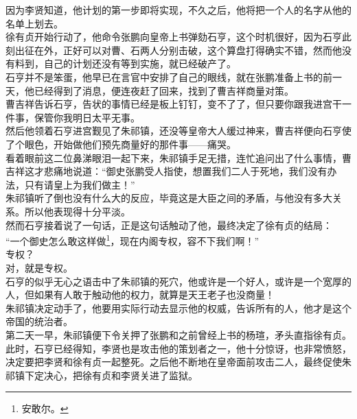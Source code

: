 \begin{multicols}{\theparacolNo}
因为李贤知道，他计划的第一步即将实现，不久之后，他将把一个人的名字从他的名单上划去。\\

徐有贞开始行动了，他命令张鹏向皇帝上书弹劾石亨，这个时机很好，因为石亨此刻出征在外，正好可以对曹、石两人分别击破，这个算盘打得确实不错，然而他没有料到，自己的计划还没有等到实施，就已经破产了。\\

石亨并不是笨蛋，他早已在言官中安排了自己的眼线，就在张鹏准备上书的前一天，他已经得到了消息，便连夜赶了回来，找到了曹吉祥商量对策。\\

曹吉祥告诉石亨，告状的事情已经是板上钉钉，变不了了，但只要你跟我进宫干一件事，保管你我明日太平无事。\\

然后他领着石亨进宫觐见了朱祁镇，还没等皇帝大人缓过神来，曹吉祥便向石亨使了个眼色，开始做他们预先商量好的那件事——痛哭。\\

看着眼前这二位鼻涕眼泪一起下来，朱祁镇手足无措，连忙追问出了什么事情，曹吉祥这才悲痛地说道：“御史张鹏受人指使，想置我们二人于死地，我们没有办法，只有请皇上为我们做主！”\\

朱祁镇听了倒也没有什么大的反应，毕竟这是大臣之间的矛盾，与他没有多大关系。所以他表现得十分平淡。\\

然而石亨接着说了一句话，正是这句话触动了他，最终决定了徐有贞的结局：\\

“一个御史怎么敢这样做\footnote{安敢尔。}，现在内阁专权，容不下我们啊！”\\

专权？\\

对，就是专权。\\

石亨的似乎无心之语击中了朱祁镇的死穴，他或许是一个好人，或许是一个宽厚的人，但如果有人敢于触动他的权力，就算是天王老子也没商量！\\

朱祁镇决定动手了，他要用实际行动去显示他的权威，告诉所有的人，他才是这个帝国的统治者。\\

第二天一早，朱祁镇便下令关押了张鹏和之前曾经上书的杨瑄，矛头直指徐有贞。\\

此时，石亨已经得知，李贤也是攻击他的策划者之一，他十分惊讶，也非常愤怒，决定要把李贤和徐有贞一起整死。之后他不断地在皇帝面前攻击二人，最终促使朱祁镇下定决心，把徐有贞和李贤关进了监狱。\\


\end{multicols}

